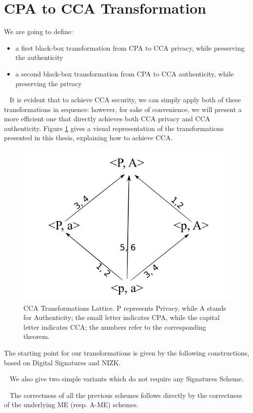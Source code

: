 \section{CPA to CCA Transformation}\label{sec:cca-transformation}
We are going to define:
\begin{itemize}
    \item a first black-box transformation from CPA to CCA privacy, while preserving the authenticity
    \item a second black-box transformation from CPA to CCA authenticity, while preserving the privacy
\end{itemize}
~\newline
It is evident that to achieve CCA security, we can simply apply both of these transformations in sequence: however, for sake of convenience, we will present a more efficient one that directly achieves both CCA privacy and CCA authenticity.
Figure \ref{fig:constr} gives a visual representation of the transformations presented in this thesis, explaining how to achieve CCA.
\begin{figure}[ht]
    \centering
    \includegraphics[width=0.7\linewidth]{images/constr.png}
    \caption{CCA Transformations Lattice. P represents Privacy, while A stands for Authenticity; the small letter indicates CPA, while the capital letter indicates CCA; the numbers refer to the corresponding theorem.}
    \label{fig:constr}
\end{figure}
\newline\newline
The starting point for our transformations is given by the following constructions, based on Digital Signatures and NIZK.


~\newline
We also give two simple variants which do not require any Signatures Scheme.


~\newline
The correctness of all the previous schemes follows directly by the correctness of the underlying ME (resp. A-ME) schemes.

